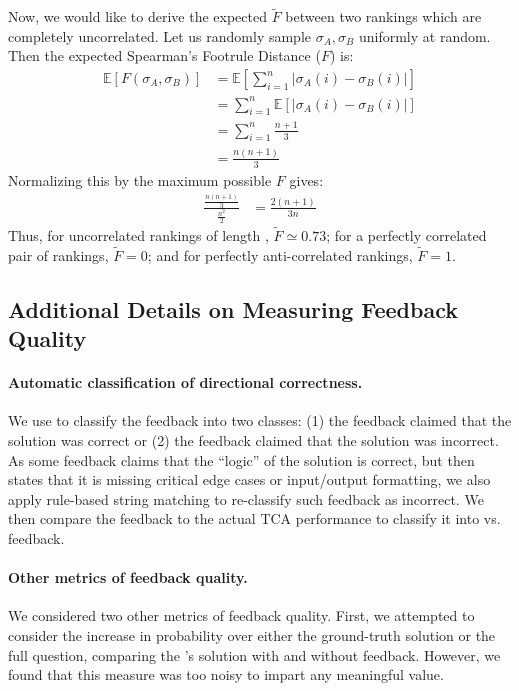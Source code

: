 Now, we would like to derive the expected $\tilde{F}$ between two rankings which are completely uncorrelated. 
Let us randomly sample $\sigma_A, \sigma_B$ uniformly at random. Then the expected Spearman's Footrule Distance ($F$) is:
%
\begin{align*}
\mathbb{E}[F(\sigma_A, \sigma_B)] &= \mathbb{E}[\sum^n_{i=1} |\sigma_A(i) - \sigma_B(i)|] \\
&= \sum^n_{i=1} \mathbb{E}[|\sigma_A(i) - \sigma_B(i)|] \\
&=  \sum^n_{i=1} \frac{n+1}{3} \\
&=  \frac{n(n+1)}{3} 
\end{align*}
Normalizing this by the maximum possible $F$ gives:
\begin{align*}
    \frac{\frac{n(n+1)}{3}}{\frac{n^2}{2}} &= \frac{2(n+1)}{3n} 
\end{align*}
Thus, for uncorrelated rankings of length \nmodels, $\tilde{F}\simeq 0.73$; for a perfectly correlated pair of rankings, $\tilde{F}=0$; and for perfectly anti-correlated rankings, $\tilde{F}=1$.

\subsection{Additional Details on Measuring Feedback Quality}
\label{app:fq}


\paragraph{Automatic classification of directional correctness.} We use \gpt{} to classify the feedback into two classes: (1) the feedback claimed that the solution was correct or (2) the feedback claimed that the solution was incorrect. 
As some feedback claims that the ``logic'' of the solution is correct, but then states that it is missing critical edge cases or input/output formatting, we also apply rule-based string matching to re-classify such feedback as incorrect.
We then compare the feedback to the actual \textsc{TCA} performance to classify it into \hqf{} vs. \lqf{} feedback.

\paragraph{Other metrics of feedback quality.} We considered two other metrics of feedback quality. 
First, we attempted to consider the increase in probability over either the ground-truth solution or the full question, comparing the \cm 's solution with and without feedback. 
However, we found that this measure was too noisy to impart any meaningful value. 

